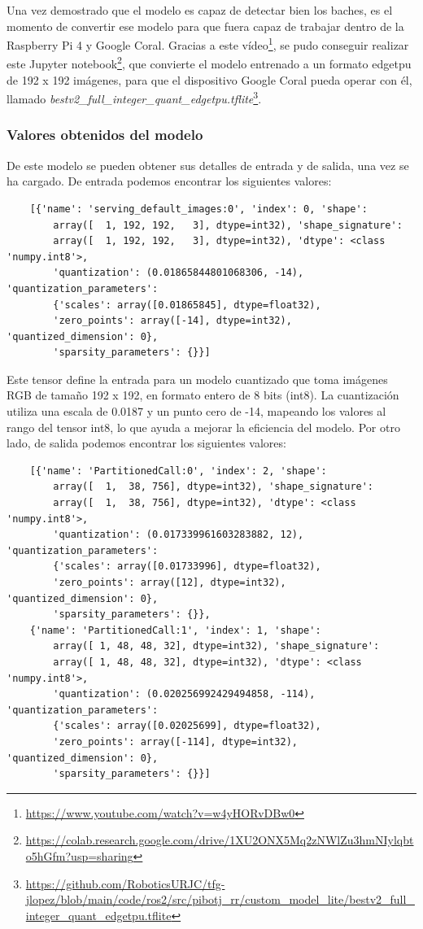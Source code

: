 Una vez demostrado que el modelo es capaz de detectar bien los baches, es el momento de convertir ese modelo para que fuera capaz de trabajar dentro de la Raspberry Pi 4 y Google Coral. Gracias a este vídeo\footnote{\url{https://www.youtube.com/watch?v=w4yHORvDBw0}}, se pudo conseguir realizar este Jupyter notebook\footnote{\url{https://colab.research.google.com/drive/1XU2ONX5Mq2zNWlZu3hmNIylqbto5hGfm?usp=sharing}}, que convierte el modelo entrenado a un formato edgetpu de 192 x 192 imágenes, para que el dispositivo Google Coral pueda operar con él, llamado \textit{bestv2\_full\_integer\_quant\_edgetpu.tflite}\footnote{\url{https://github.com/RoboticsURJC/tfg-jlopez/blob/main/code/ros2/src/pibotj_rr/custom_model_lite/bestv2_full_integer_quant_edgetpu.tflite}}.

\subsubsection{Valores obtenidos del modelo}
\label{subsec:valoresmodelotflite}

De este modelo se pueden obtener sus detalles de entrada y de salida, una vez se ha cargado. De entrada podemos encontrar los siguientes valores: 

\begin{verbatim}
	[{'name': 'serving_default_images:0', 'index': 0, 'shape': 
		array([  1, 192, 192,   3], dtype=int32), 'shape_signature': 
		array([  1, 192, 192,   3], dtype=int32), 'dtype': <class 'numpy.int8'>, 
		'quantization': (0.01865844801068306, -14), 'quantization_parameters': 
		{'scales': array([0.01865845], dtype=float32), 
		'zero_points': array([-14], dtype=int32), 'quantized_dimension': 0}, 
		'sparsity_parameters': {}}]
\end{verbatim}

Este tensor define la entrada para un modelo cuantizado que toma imágenes RGB de tamaño 192 x 192, en formato entero de 8 bits (int8). La cuantización utiliza una escala de 0.0187 y un punto cero de -14, mapeando los valores al rango del tensor int8, lo que ayuda a mejorar la eficiencia del modelo. Por otro lado, de salida podemos encontrar los siguientes valores: 

\begin{verbatim}
	[{'name': 'PartitionedCall:0', 'index': 2, 'shape': 
		array([  1,  38, 756], dtype=int32), 'shape_signature': 
		array([  1,  38, 756], dtype=int32), 'dtype': <class 'numpy.int8'>,
		'quantization': (0.017339961603283882, 12), 'quantization_parameters':
		{'scales': array([0.01733996], dtype=float32), 
		'zero_points': array([12], dtype=int32), 'quantized_dimension': 0},
	  	'sparsity_parameters': {}},
	{'name': 'PartitionedCall:1', 'index': 1, 'shape': 
		array([ 1, 48, 48, 32], dtype=int32), 'shape_signature': 
		array([ 1, 48, 48, 32], dtype=int32), 'dtype': <class 'numpy.int8'>, 
		'quantization': (0.020256992429494858, -114), 'quantization_parameters': 
		{'scales': array([0.02025699], dtype=float32), 
		'zero_points': array([-114], dtype=int32), 'quantized_dimension': 0},
		'sparsity_parameters': {}}]
\end{verbatim}

